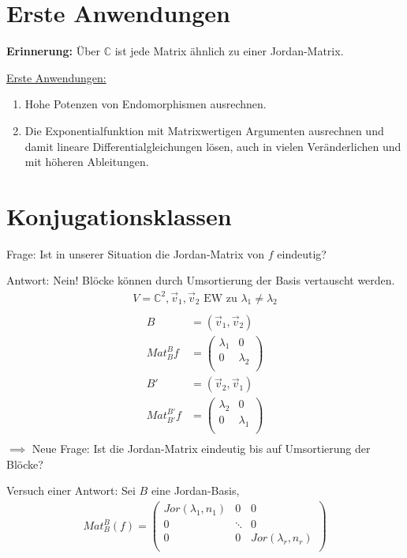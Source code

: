 \documentclass{report}
\newcommand*{\newpar}{\par\vspace{\baselineskip}\noindent}
\newcommand{\bC}{\mathbb{C}}
\newcommand{\vv}{\vec{v}}
\begin{document}
\section{Erste Anwendungen}
\textbf{Erinnerung:} Über $\bC$ ist jede Matrix ähnlich zu einer Jordan-Matrix.
\newpar
\underline{Erste Anwendungen:}
\begin{enumerate}
 \item Hohe Potenzen von Endomorphismen ausrechnen.
 \item Die Exponentialfunktion mit Matrixwertigen Argumenten ausrechnen und damit lineare Differentialgleichungen lösen, auch in vielen Veränderlichen und mit höheren Ableitungen.
\end{enumerate}
\section{Konjugationsklassen}
\newpar
Frage: Ist in unserer Situation die Jordan-Matrix von $f$ eindeutig?
\newpar
Antwort: Nein! Blöcke können durch Umsortierung der Basis vertauscht werden.
\begin{align*}
 V = \bC^2, \vv_1, \vv_2 \text{ EW zu } \lambda_1 \neq \lambda_2\\
\end{align*}
\begin{align*}
 B &= (\vv_1, \vv_2)\\
 Mat_B^B f &= \begin{pmatrix}
              \lambda_1 & 0\\
              0 & \lambda_2\\
             \end{pmatrix}\\
 B' &= (\vv_2, \vv_1)\\
 Mat_{B'}^{B'} f &= \begin{pmatrix}
              \lambda_2 & 0\\
              0 & \lambda_1\\
             \end{pmatrix}\\
\end{align*}
$\implies$ Neue Frage: Ist die Jordan-Matrix eindeutig bis auf Umsortierung der Blöcke?
\newpar
Versuch einer Antwort: Sei $B$ eine Jordan-Basis,
\begin{align*}
 Mat_B^B (f) = \begin{pmatrix}
                Jor(\lambda_1, n_1) & 0 & 0\\
                0 & \ddots & 0\\
                0 & 0 & Jor(\lambda_r, n_r)\\
               \end{pmatrix}
\end{align*}
\end{document}
